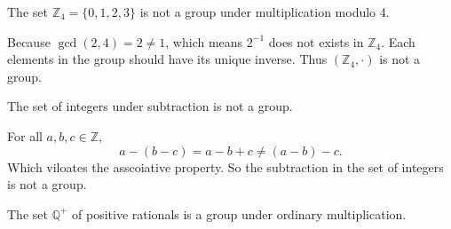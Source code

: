 \begin{example}
    The set $\mathbb{Z}_4 = \{ 0, 1, 2, 3 \}$ is not a group under multiplication modulo 4.
\end{example}
\begin{solution}
    Because $\gcd(2,4) = 2 \neq 1$, which means $2^{-1}$ does not exists in $\mathbb{Z}_4$. Each elements 
    in the group should have its unique inverse.
    Thus $(\mathbb{Z}_4, \cdot)$ is not a group.
\end{solution}

\begin{example}
    The set of integers under subtraction is not a group.
\end{example}
\begin{solution}
    For all $a, b, c \in \mathbb{Z}$, 
    \[
        a - (b - c) = a - b + c \neq (a - b) - c.
    \]
    Which viloates the asscoiative property. So the subtraction in the set of integers is not a group.
\end{solution}

\begin{example}
    The set $\mathbb{Q}^{+}$ of positive rationals is a group under ordinary multiplication.
\end{example}

